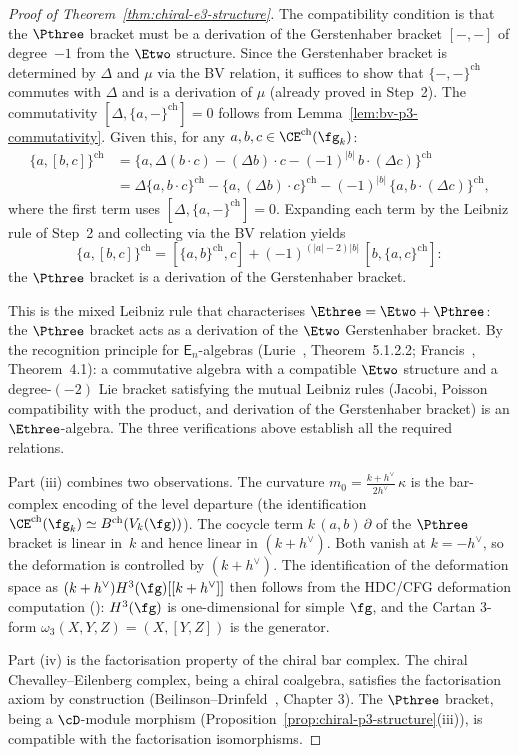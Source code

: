 \begin{proof}[Proof of Theorem~\ref{thm:chiral-e3-structure}]
The compatibility condition is that the $\Pthree$ bracket
must be a derivation of the Gerstenhaber bracket
$[-,-]$ of degree~$-1$ from the $\Etwo$ structure.
Since the Gerstenhaber bracket is determined by $\Delta$
and $\mu$ via the BV relation, it suffices to show that
$\{-,-\}^{\mathrm{ch}}$ commutes with $\Delta$ and is a
derivation of $\mu$ (already proved in Step~2). The
commutativity $[\Delta, \{a,-\}^{\mathrm{ch}}] = 0$
follows from Lemma~\ref{lem:bv-p3-commutativity}.
Given this, for any $a, b, c \in
\CE^{\mathrm{ch}}(\fg_k)$:
\begin{align*}
 \{a, [b, c]\}^{\mathrm{ch}}
 &= \{a, \Delta(b \cdot c)
 - (\Delta b) \cdot c
 - (-1)^{|b|}\,b \cdot (\Delta c)\}^{\mathrm{ch}} \\
 &= \Delta\{a, b \cdot c\}^{\mathrm{ch}}
 - \{a, (\Delta b) \cdot c\}^{\mathrm{ch}}
 - (-1)^{|b|}\,\{a, b \cdot (\Delta c)\}^{\mathrm{ch}},
\end{align*}
where the first term uses
$[\Delta, \{a,-\}^{\mathrm{ch}}] = 0$. Expanding each
term by the Leibniz rule of Step~2 and collecting via the
BV relation yields
\[
 \{a, [b, c]\}^{\mathrm{ch}}
 = [\{a, b\}^{\mathrm{ch}}, c]
 + (-1)^{(|a|-2)|b|}\,[b, \{a, c\}^{\mathrm{ch}}]:
\]
the $\Pthree$ bracket is a derivation of the
Gerstenhaber bracket.

This is the mixed Leibniz rule that characterises
$\Ethree = \Etwo + \Pthree$: the $\Pthree$ bracket acts
as a derivation of the $\Etwo$ Gerstenhaber bracket. By
the recognition principle for $\mathsf{E}_n$-algebras
(Lurie~\cite{HA}, Theorem~5.1.2.2;
Francis~\cite{Francis2013}, Theorem~4.1): a commutative
algebra with a compatible $\Etwo$ structure and a
degree-$(-2)$ Lie bracket satisfying the mutual Leibniz
rules (Jacobi, Poisson compatibility with the product, and
derivation of the Gerstenhaber bracket) is an
$\Ethree$-algebra. The three verifications above establish
all the required relations.

Part (iii) combines two observations. The curvature
$m_0 = \tfrac{k + h^\vee}{2h^\vee}\,\kappa$ is the bar-complex
encoding of the level departure (the identification
$\CE^{\mathrm{ch}}(\fg_k) \simeq B^{\mathrm{ch}}(V_k(\fg))$).
The cocycle term
$k\,(a,b)\,\partial$ of the $\Pthree$ bracket is linear
in~$k$ and hence linear in $(k + h^\vee)$.
Both vanish at $k = -h^\vee$, so the
deformation is controlled by $(k + h^\vee)$. The identification
of the deformation space as $(k+h^\vee) H^3(\fg)[[k+h^\vee]]$
then follows from the HDC/CFG deformation computation
\textup{(}\cite{HA,Francis2013,CFG25}\textup{)}: $H^3(\fg)$ is
one-dimensional for simple $\fg$, and the Cartan $3$-form
$\omega_3(X, Y, Z) = (X, [Y,Z])$ is the generator.

Part (iv) is the factorisation property of the chiral
bar complex. The chiral Chevalley--Eilenberg complex, being
a chiral coalgebra, satisfies the factorisation axiom
by construction (Beilinson--Drinfeld~\cite{BD04}, Chapter 3).
The $\Pthree$ bracket, being a $\cD$-module morphism
(Proposition~\ref{prop:chiral-p3-structure}(iii)), is
compatible with the factorisation isomorphisms.
\end{proof}

